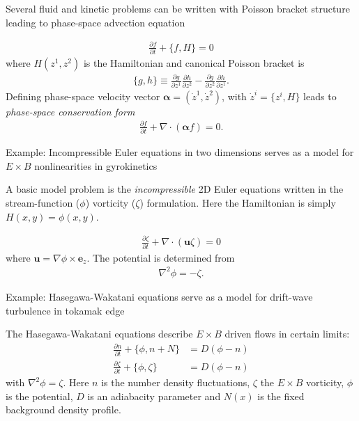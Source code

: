 \documentclass[pdf]{beamer}
\newcommand{\pfrac}[2]{\frac{\partial #1}{\partial #2}}
\newcommand{\mvec}[1]{\mathbf{#1}}
\newcommand{\gvec}[1]{\boldsymbol{#1}}
\newcommand{\eez}{\mvec{e}_z}
\theoremstyle{definition}
\begin{document}
\begin{frame}{Several fluid and kinetic problems can be written with
    Poisson bracket structure leading to phase-space advection
    equation}%

  \begin{align*}
    \pfrac{f}{t} + \{f,H\} = 0
  \end{align*}
  where $H(z^1,z^2)$ is the Hamiltonian and canonical Poisson bracket
  is
  \begin{align*}
    \{g,h\} \equiv \pfrac{g}{z^1}\pfrac{h}{z^2} -
    \pfrac{g}{z^2}\pfrac{h}{z^1}.
  \end{align*}
  Defining phase-space velocity vector $\gvec{\alpha} = (\dot{z}^1,
  \dot{z}^2)$, with $\dot{z}^i = \{z^i,H\}$ leads to \emph{phase-space
    conservation form}
  \begin{align*}
    \pfrac{f}{t} + \nabla\cdot\left(\gvec{\alpha}f\right) = 0.
  \end{align*}
\end{frame}

\begin{frame}{Example: Incompressible Euler equations in two
    dimensions serves as a model for $E\times B$ nonlinearities in
    gyrokinetics}%

  A basic model problem is the \emph{incompressible} 2D Euler
  equations written in the stream-function ($\phi$) vorticity
  ($\zeta$) formulation. Here the Hamiltonian is simply $H(x,y) =
  \phi(x,y)$.

  \begin{align*}
    \pfrac{\zeta}{t} + \nabla\cdot(\mvec{u}\zeta) = 0
  \end{align*}
  where $\mvec{u} = \nabla\phi \times \eez$. The potential is
  determined from
  \begin{align*}
    \nabla^2 \phi = -\zeta.
  \end{align*}
\end{frame}

\begin{frame}{Example: Hasegawa-Wakatani equations serve as a model
    for drift-wave turbulence in tokamak edge}%

  The Hasegawa-Wakatani equations describe $E\times B$ driven flows in
  certain limits:
  \begin{align*}
    \pfrac{n}{t} + \{\phi,n+N\} &= D(\phi-n) \\
    \pfrac{\zeta}{t} + \{\phi,\zeta\} &= D(\phi-n)
  \end{align*}
  with $\nabla^2 \phi = \zeta.$ Here $n$ is the number density
  fluctuations, $\zeta$ the $E\times B$ vorticity, $\phi$ is the
  potential, $D$ is an adiabacity parameter and $N(x)$ is the fixed
  background density profile.

\end{frame}
\end{document}
